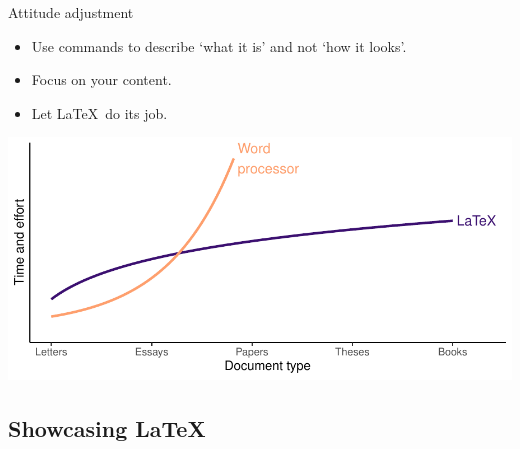 \documentclass[,aspectratio=43]{beamer}
\begin{document}
\begin{frame}{Attitude adjustment}
\protect\hypertarget{attitude-adjustment}{}
\begin{itemize}
\item
  Use commands to describe `what it is' and not `how it looks'.
\item
  Focus on your content.
\item
  Let \LaTeX~do its job.
\end{itemize}

\begin{center}\includegraphics[width=1\linewidth]{figure/latexgraph-1} \end{center}
\end{frame}

\hypertarget{showcasing}{%
\subsection{\texorpdfstring{Showcasing
\LaTeX}{Showcasing }}\label{showcasing}}
\end{document}

